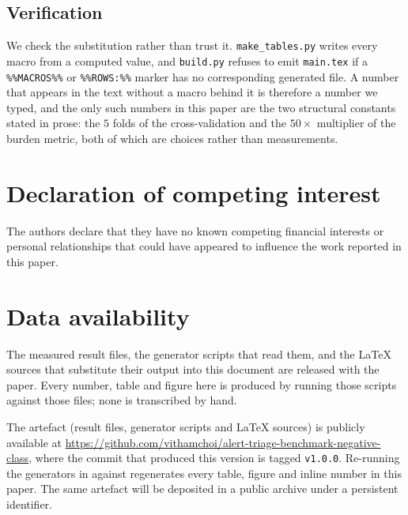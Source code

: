 \documentclass[journal]{IEEEtran}
\theoremstyle{definition}
\begin{document}
\subsection{Verification}

We check the substitution rather than trust it. \texttt{make\_tables.py} writes
every macro from a computed value, and \texttt{build.py} refuses to emit
\texttt{main.tex} if a \texttt{\%\%MACROS\%\%} or \texttt{\%\%ROWS:\%\%} marker
has no corresponding generated file. A number that appears in the text without a
macro behind it is therefore a number we typed, and the only such numbers in
this paper are the two structural constants stated in prose: the \(5\) folds of
the cross-validation and the \(50\times\) multiplier of the burden metric, both
of which are choices rather than measurements.


\section*{Declaration of competing interest}

The authors declare that they have no known competing financial interests or
personal relationships that could have appeared to influence the work reported
in this paper.


\section*{Data availability}

The measured result files, the generator scripts that read them, and the LaTeX
sources that substitute their output into this document are released with the
paper. Every number, table and figure here is produced by running those scripts
against those files; none is transcribed by hand.

The artefact (result files, generator scripts and \LaTeX{} sources) is publicly
available at \url{https://github.com/vithamchoi/alert-triage-benchmark-negative-class}, where the commit that
produced this version is tagged \texttt{v1.0.0}. Re-running the generators in
 against  regenerates every table, figure and
inline number in this paper. The same artefact will be deposited in a public
archive under a persistent identifier.




\end{document}
